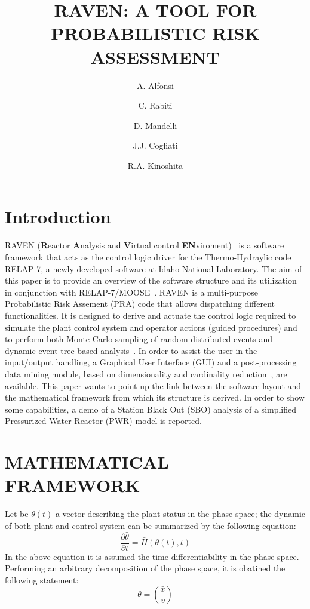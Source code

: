 \documentclass{anstrans}
\title{RAVEN: A TOOL FOR PROBABILISTIC RISK ASSESSMENT}
\author{A. Alfonsi \and  C. Rabiti \and D. Mandelli \and J.J. Cogliati \and R.A. Kinoshita}
\institute{
Idaho National Laboratory
}
\begin{document}
  \twocolumn[
    \begin{@twocolumnfalse}
        \maketitle
    \end{@twocolumnfalse}
  ]

\section{Introduction}
RAVEN (\textbf{R}eactor \textbf{A}nalysis and \textbf{V}irtual control \textbf{EN}viroment)~\cite{ravenFY12,mandelliANS2012} is a software framework that acts as the control logic driver for the Thermo-Hydraylic code RELAP-7, a newly developed software at Idaho National Laboratory. The aim of this paper is to provide an overview of the software structure and its utilization in conjunction with RELAP-7/MOOSE~\cite{MOOSE,relap7FY12}. RAVEN is a multi-purpose Probabilistic Risk Assement (PRA) code that allows dispatching different functionalities. 
It is designed to derive and actuate the control logic required to simulate the plant control system and operator actions (guided procedures) and to perform both Monte-Carlo sampling of random distributed events and dynamic event tree based analysis~\cite{ADAPTHakobyan}. 
In order to assist the user in the input/output handling, a Graphical User Interface (GUI) and a post-processing data mining module, based on dimensionality and cardinality reduction~\cite{mandelliEsrel2011}, are available.
This paper wants to point up the link between the software layout and the mathematical framework from which its structure is derived. In order to show some capabilities, a demo of a Station Black Out (SBO) analysis of a simplified Pressurized Water Reactor (PWR) model is reported.
\section{MATHEMATICAL FRAMEWORK}
\label{sec:mathFramework}
Let be $\bar{\theta}(t)$ a vector describing the plant status in the phase space; the dynamic of both plant and control system can be summarized by the following equation:
\begin{equation}
\frac{\partial \bar{\theta}}{\partial t} = \bar{H}(\theta(t),t)
\label{eq:SystemDynamics}
\end{equation}
In the above equation it is assumed the time differentiability in the phase space. Performing an arbitrary decomposition of the phase space, it is obatined the following statement:
\begin{equation}
\bar{\theta}=\binom{\bar{x}}{\bar{v}}
\label{eq:firstDecomposition}
\end{equation}
\end{document}
